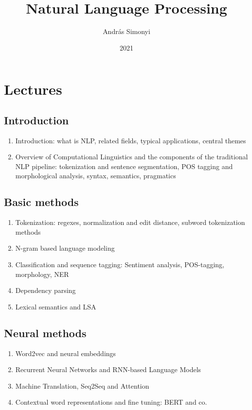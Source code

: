 \documentclass[10pt, a4paper]{article}
\author{András Simonyi}
\date{2021}
\title{Natural Language Processing}
\begin{document}
\maketitle
\section*{Lectures}
\subsection*{Introduction}
\begin{enumerate}
\item Introduction: what is NLP, related fields, typical applications, central
  themes
\item Overview of Computational Linguistics and the components of the
  traditional NLP pipeline: tokenization and sentence segmentation, POS tagging
  and morphological analysis, syntax, semantics, pragmatics
\end{enumerate}
\subsection*{Basic methods}
\begin{enumerate}
\item Tokenization: regexes, normalization and edit distance, subword
  tokenization methods
\item N-gram based language modeling
\item Classification and sequence tagging: Sentiment analysis,
POS-tagging, morphology, NER
\item Dependency parsing
\item Lexical semantics and LSA
\end{enumerate}
\subsection*{Neural methods}
\begin{enumerate}
\item Word2vec and neural embeddings
\item Recurrent Neural Networks and RNN-based Language Models
\item Machine Translation, Seq2Seq and Attention
\item Contextual word representations and fine tuning: BERT and co.
\end{enumerate}
\end{document}
